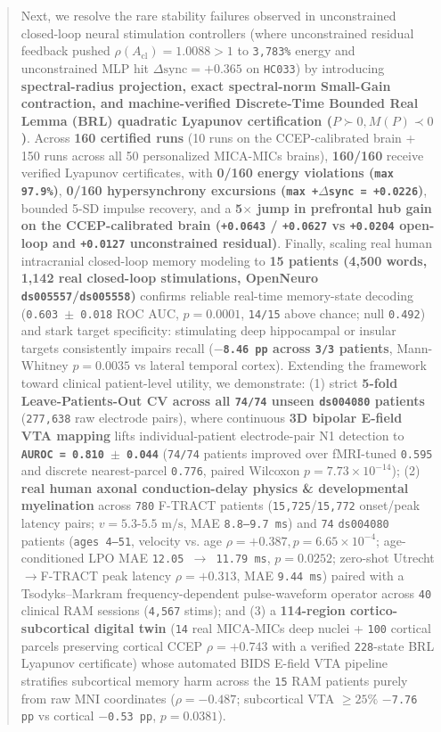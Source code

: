 \documentclass[11pt,a4paper]{article}
\begin{document}
\begin{abstract}
Next, we resolve the rare stability failures observed in unconstrained closed-loop neural stimulation controllers (where unconstrained residual feedback pushed $\rho(A_{\text{cl}}) = 1.0088 > 1$ to \texttt{3,783\%} energy and unconstrained MLP hit $\Delta\text{sync} = +0.365$ on \texttt{HC033}) by introducing \textbf{spectral-radius projection, exact spectral-norm Small-Gain contraction, and machine-verified Discrete-Time Bounded Real Lemma (BRL) quadratic Lyapunov certification ($P \succ 0, M(P) \prec 0$)}. Across \textbf{160 certified runs} (10 runs on the CCEP-calibrated brain + 150 runs across all 50 personalized MICA-MICs brains), \textbf{160/160} receive verified Lyapunov certificates, with \textbf{0/160 energy violations (\texttt{max 97.9\%})}, \textbf{0/160 hypersynchrony excursions (\texttt{max +$\Delta$sync = +0.0226})}, bounded 5-SD impulse recovery, and a \textbf{5$\times$ jump in prefrontal hub gain on the CCEP-calibrated brain (\texttt{+0.0643} / \texttt{+0.0627} vs \texttt{+0.0204} open-loop and \texttt{+0.0127} unconstrained residual)}. Finally, scaling real human intracranial closed-loop memory modeling to \textbf{15 patients (4,500 words, 1,142 real closed-loop stimulations, OpenNeuro \texttt{ds005557}/\texttt{ds005558})} confirms reliable real-time memory-state decoding (\texttt{0.603 $\pm$ 0.018} ROC AUC, $p = 0.0001$, \texttt{14/15} above chance; null \texttt{0.492}) and stark target specificity: stimulating deep hippocampal or insular targets consistently impairs recall (\textbf{\texttt{$-$8.46 pp} across \texttt{3/3} patients}, Mann-Whitney $p = 0.0035$ vs lateral temporal cortex). Extending the framework toward clinical patient-level utility, we demonstrate: (1) strict \textbf{5-fold Leave-Patients-Out CV across all \texttt{74/74} unseen \texttt{ds004080} patients} (\texttt{277,638} raw electrode pairs), where continuous \textbf{3D bipolar E-field VTA mapping} lifts individual-patient electrode-pair N1 detection to \textbf{\texttt{AUROC = 0.810 $\pm$ 0.044}} (\texttt{74/74} patients improved over fMRI-tuned \texttt{0.595} and discrete nearest-parcel \texttt{0.776}, paired Wilcoxon $p = 7.73 \times 10^{-14}$); (2) \textbf{real human axonal conduction-delay physics \& developmental myelination} across \texttt{780} F-TRACT patients (\texttt{15,725}/\texttt{15,772} onset/peak latency pairs; $v = 5.3\text{-}5.5\text{ m/s}$, MAE \texttt{8.8--9.7 ms}) and \texttt{74} \texttt{ds004080} patients (\texttt{ages 4--51}, velocity vs. age $\rho = +0.387, p = 6.65 \times 10^{-4}$; age-conditioned LPO MAE \texttt{12.05 $\to$ 11.79 ms}, $p = 0.0252$; zero-shot Utrecht$\to$F-TRACT peak latency $\rho = +0.313$, MAE \texttt{9.44 ms}) paired with a Tsodyks--Markram frequency-dependent pulse-waveform operator across \texttt{40} clinical RAM sessions (\texttt{4,567} stims); and (3) a \textbf{114-region cortico-subcortical digital twin} (\texttt{14} real MICA-MICs deep nuclei + \texttt{100} cortical parcels preserving cortical CCEP $\rho = +0.743$ with a verified \texttt{228}-state BRL Lyapunov certificate) whose automated BIDS E-field VTA pipeline stratifies subcortical memory harm across the \texttt{15} RAM patients purely from raw MNI coordinates ($\rho = -0.487$; subcortical VTA $\ge 25\%$ \texttt{$-$7.76 pp} vs cortical \texttt{$-$0.53 pp}, $p = 0.0381$).


\end{abstract}
\end{document}
